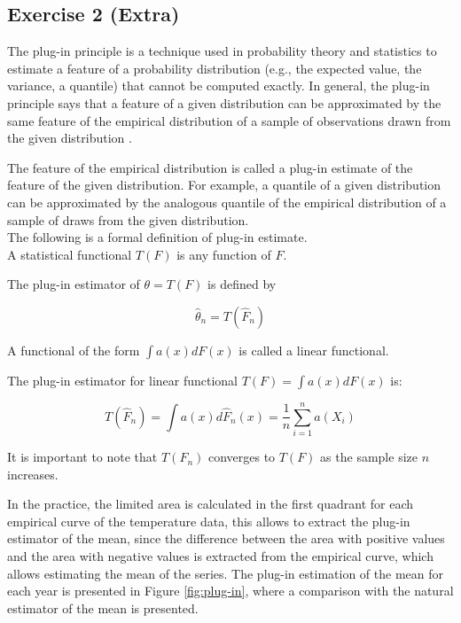 \documentclass[11pt]{article}
\theoremstyle{definition}
\theoremstyle{remark}
\theoremstyle{remark}
\begin{document}
\subsection*{Exercise 2 (Extra)}

The plug-in principle is a technique used in probability theory and
statistics to estimate a feature of a probability distribution (e.g.,
the expected value, the variance, a quantile) that cannot be computed
exactly. In general, the plug-in principle says that a feature of a
given distribution can be approximated by the same feature of the
empirical distribution of a sample of observations drawn from the
given distribution \cite{van2000asymptotic}.

The feature of the empirical distribution is called a plug-in estimate
of the feature of the given distribution. For example, a quantile of a
given distribution can be approximated by the analogous quantile of
the empirical distribution of a sample of draws from the given
distribution.
\\

The following is a formal definition of plug-in estimate.
\\

A statistical functional $T(F)$ is any function of $F$.

The plug-in estimator of $\theta=T(F)$ is defined by

\[
  \widehat{\theta}_{n}=T\left(\widehat{F}_{n}\right)
\]

A functional of the form $\int a(x) d F(x)$ is called a linear
functional.

The plug-in estimator for linear functional $T(F)=\int a(x) d F(x)$
is:

\[
  T\left(\widehat{F}_{n}\right)=\int a(x) d
  \widehat{F}_{n}(x)=\frac{1}{n} \sum_{i=1}^{n} a\left(X_{i}\right)
\]

It is important to note that $T\left(F_{n}\right)$ converges to $T(F)$
as the sample size $n$ increases.

In the practice, the limited area is calculated in the first quadrant
for each empirical curve of the temperature data, this allows to
extract the plug-in estimator of the mean, since the difference
between the area with positive values and the area with negative
values is extracted from the empirical curve, which allows estimating
the mean of the series. The plug-in estimation of the mean for each
year is presented in Figure \ref{fig:plug-in}, where a comparison with
the natural estimator of the mean is presented.
\end{document}
